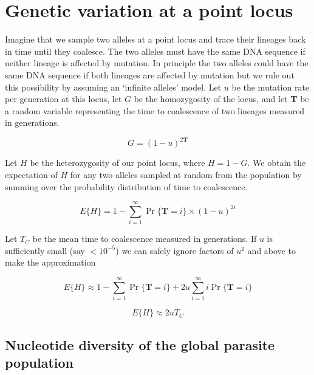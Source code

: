 \documentclass[_main.tex]{subfiles}
\begin{document}
\section{Genetic variation at a point locus}
\label{supp_point_locus}

Imagine that we sample two alleles at a point locus and trace their lineages back in time until they coalesce.  The two alleles must have the same DNA sequence if neither lineage is affected by mutation.  In principle the two alleles could have the same DNA sequence if both lineages are affected by mutation but we rule out this possibility by assuming an `infinite alleles' model.  Let $u$ be the mutation rate per generation at this locus, let $G$ be the homozygosity of the locus, and let \textbf{T} be a random variable representing the time to coalescence of two lineages measured in generations.

\begin{equation*}
G = (1 - u)^{2 \textbf{T}}
\label{eq:supp_G}
\end{equation*}

Let $H$ be the heterozygosity of our point locus, where $H = 1 - G$.  We obtain the expectation of $H$ for any two alleles sampled at random from the population by summing over the probability distribution of time to coalescence.  
  
\begin{equation*}
E \{ H  \} = 1 - \sum_{i=1}^\infty \Pr \{ \textbf{T} = i \} \times (1-u)^{2i}
\end{equation*}

Let $T_C$ be the mean time to coalescence measured in generations.  If $u$ is sufficiently small (say $<10^{-5}$) we can safely ignore factors of $u^2$ and above to make the approximation

\begin{equation*}
E \{ H  \} \approx 1 - \sum_{i=1}^\infty \Pr \{ \textbf{T} = i \}  + 2u \sum_{i=1}^\infty i\Pr \{ \textbf{T} = i \}
\end{equation*}

\begin{equation*}
E \{ H \} \approx 2 u T_C
\label{eq:supp_het_approx}
\end{equation*}


\subsection{Nucleotide diversity of the global parasite population}
\label{supp_global_pi}
\end{document}
